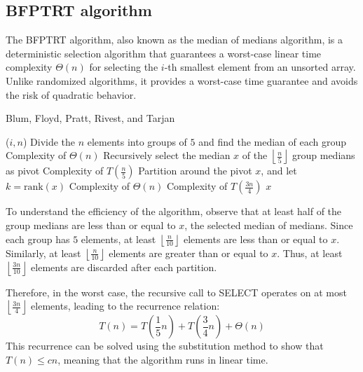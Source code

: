 \subsection{BFPTRT algorithm}
The BFPTRT algorithm, also known as the median of medians algorithm, is a deterministic selection algorithm that guarantees a worst-case linear time complexity $\Theta(n)$ for selecting the $i$-th smallest element from an unsorted array. 
Unlike randomized algorithms, it provides a worst-case time guarantee and avoids the risk of quadratic behavior.
\begin{algorithm}[H]
    \caption{Blum, Floyd, Pratt, Rivest, and Tarjan}
    \begin{algorithmic}[1]
        ($i,n$) 
            \State Divide the $n$ elements into groups of $5$ and find the  median of each group \Comment Complexity of $\Theta(n)$
            \State Recursively select the median $x$ of the $\left\lfloor \frac{n}{5} \right\rfloor$ group medians as pivot \Comment Complexity of $T\left(\frac{n}{5}\right)$
            \State Partition around the pivot $x$, and let $k = \text{rank}(x)$ \Comment Complexity of $\Theta(n)$
             \Comment Complexity of $T\left(\frac{3n}{4}\right)$
                \State \Return $x$ 
                \State {}
            \Else 
                \State {}
            \EndIf
        \EndFunction
    \end{algorithmic}
\end{algorithm}  
To understand the efficiency of the algorithm, observe that at least half of the group medians are less than or equal to $x$, the selected median of medians.
Since each group has $5$ elements, at least $\left\lfloor\frac{n}{10}\right\rfloor$ elements are less than or equal to $x$. 
Similarly, at least $\left\lfloor\frac{n}{10}\right\rfloor$ elements are greater than or equal to $x$. 
Thus, at least $\left\lfloor\frac{3n}{10}\right\rfloor$ elements are discarded after each partition.

Therefore, in the worst case, the recursive call to SELECT operates on at most $\left\lfloor\frac{3n}{4}\right\rfloor$ elements, leading to the recurrence relation:
\[T(n)=T\left(\dfrac{1}{5}n\right)+T\left(\dfrac{3}{4}n\right)+\Theta(n)\]
This recurrence can be solved using the substitution method to show that $T(n)\leq cn$, meaning that the algorithm runs in linear time.

